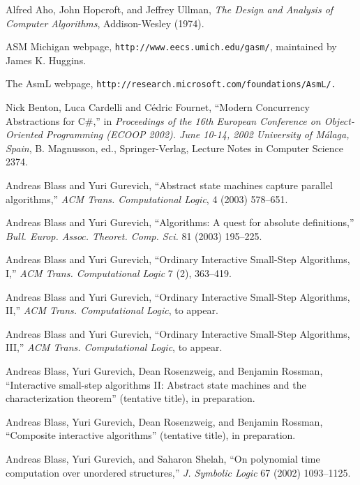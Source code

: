 \documentclass{LMCS}
\theoremstyle{definition}
\begin{document}
\begin{thebibliography}{99}

Alfred Aho, John Hopcroft, and Jeffrey Ullman, \emph{The Design and
  Analysis of Computer Algorithms}, Addison-Wesley (1974).

 ASM Michigan webpage, {\tt http://www.eecs.umich.edu/gasm/},
 maintained by James K. Huggins.

 The AsmL webpage,
 {\tt http://research.microsoft.com/foundations/AsmL/.}

Nick Benton, Luca Cardelli and C\'edric Fournet, ``Modern Concurrency
Abstractions for C\#,'' in \emph{Proceedings of the 16th
European Conference on Object-Oriented Programming (ECOOP 2002). June
10-14, 2002 University of M\'{a}laga, Spain}, B. Magnusson, ed.,
Springer-Verlag, Lecture Notes in Computer Science 2374.

 Andreas Blass and Yuri Gurevich, ``Abstract state machines
capture parallel algorithms,'' \emph{ACM Trans. Computational Logic},
4 (2003) 578--651.

Andreas Blass and Yuri Gurevich, ``Algorithms: A quest for absolute
definitions,'' \emph{Bull. Europ. Assoc. Theoret. Comp. Sci.} 81
(2003) 195--225.

 Andreas Blass and Yuri Gurevich, ``Ordinary Interactive
Small-Step Algorithms, I,'' \emph{ACM Trans. Computational Logic} 7 (2),
363--419.

Andreas Blass and Yuri Gurevich, ``Ordinary Interactive Small-Step
Algorithms, II,'' \emph{ACM Trans. Computational Logic}, to
appear.

Andreas Blass and Yuri Gurevich, ``Ordinary Interactive Small-Step
Algorithms, III,'' \emph{ACM Trans. Computational Logic}, to
appear.

 Andreas Blass, Yuri Gurevich, Dean Rosenzweig, and
  Benjamin Rossman, ``Interactive small-step algorithms II: Abstract
  state machines and the characterization theorem'' (tentative title),
  in preparation.

 Andreas Blass, Yuri Gurevich, Dean Rosenzweig, and
Benjamin Rossman, ``Composite interactive algorithms'' (tentative
title), in preparation.

Andreas Blass, Yuri Gurevich, and Saharon Shelah, ``On polynomial time
computation over unordered structures,'' \emph{J. Symbolic Logic} 67
(2002) 1093--1125.


\end{thebibliography}
\end{document}
